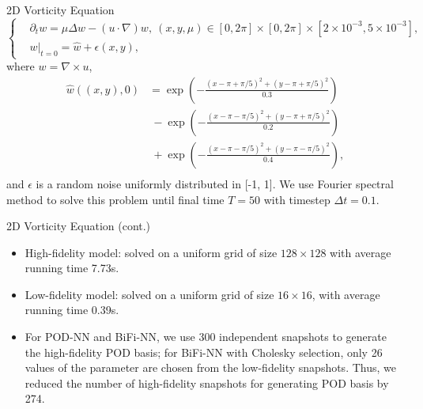 \documentclass[10pt]{beamer}
\begin{document}
\begin{frame}{2D Vorticity Equation}
$$
\left\{
\begin{aligned}
&\partial_t w = \mu\Delta w-(u\cdot\nabla)w, \ (x, y, \mu)\in [0, 2\pi]\times [0, 2\pi]\times [2\times 10^{-3}, 5\times 10^{-3}], \\
&w|_{t=0} = \hat{w}+\epsilon(x, y),
\end{aligned}
\right.
$$
where $w = \nabla\times u$, 
$$
\begin{aligned}
    \hat{w}((x, y),0)&= \exp\left(-\frac{(x-\pi+\pi/5)^2+(y-\pi+\pi/5)^2}{0.3}\right) \\
    &\ -\exp\left(-\frac{(x-\pi-\pi/5)^2+(y-\pi+\pi/5)^2}{0.2}\right) \\
    &\ +\exp\left(-\frac{(x-\pi-\pi/5)^2+(y-\pi-\pi/5)^2}{0.4}\right), \\
\end{aligned}
$$
and $\epsilon$ is a random noise uniformly distributed in [-1, 1]. We use Fourier spectral method to solve this problem until final time $T = 50$ with timestep $\Delta t = 0.1$.

\end{frame}

\begin{frame}{2D Vorticity Equation (cont.)}
\begin{itemize}
\item High-fidelity model: solved on a uniform grid of size $128\times 128$ with average running time 7.73s.
\item Low-fidelity model: solved on a uniform grid of size $16\times 16$, with average running time 0.39s.
\item For POD-NN and BiFi-NN, we use 300 independent snapshots to generate the high-fidelity POD basis; for BiFi-NN with Cholesky selection, only 26 values of the parameter are chosen from the low-fidelity snapshots. Thus, we reduced the number of high-fidelity snapshots for generating POD basis by 274.
\end{itemize}  
\end{frame}
\end{document}

